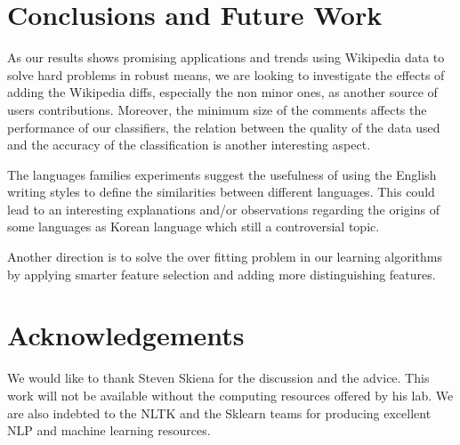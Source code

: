 \documentclass[11pt]{article}
\begin{document}
\section{Conclusions and Future Work}
As our results shows promising applications and trends using Wikipedia data to solve hard problems in robust means, we are looking to investigate the effects of adding the Wikipedia diffs, especially the non minor ones, as another source of users contributions. Moreover, the minimum size of the comments affects the performance of our classifiers, the relation between the quality of the data used and the accuracy of the classification is another interesting aspect.

The languages families experiments suggest the usefulness of using the English writing styles to define the similarities between different languages. This could lead to an interesting explanations and/or observations regarding the origins of some languages as Korean language which still a controversial topic.

Another direction is to solve the over fitting problem in our learning algorithms by applying smarter feature selection and adding more distinguishing features.



\section*{Acknowledgements}
We would like to thank Steven Skiena for the discussion and the advice. This work will not be available without the computing resources offered by his lab. We are also indebted to the NLTK and the Sklearn teams for producing excellent NLP and machine learning resources.
\end{document}
